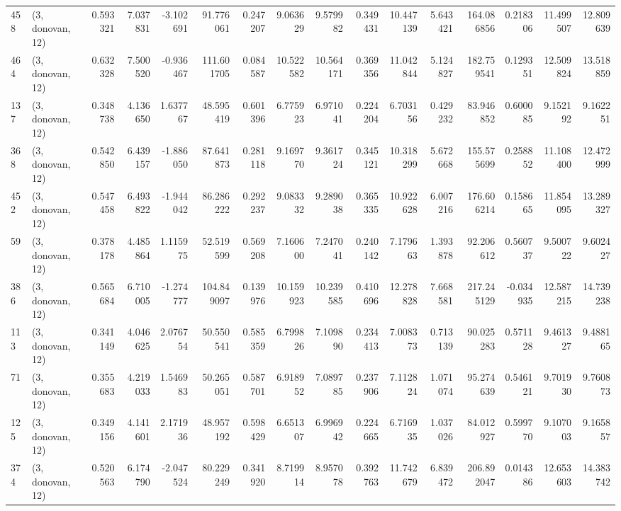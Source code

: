 \begin{tabular}{llrrrrrrrrrrrrrr}
458 &  (3, donovan, 12) &   0.593321 &   7.037831 &  -3.102691 &    91.776061 &   0.247207 &   9.063629 &   9.579982 &  0.349431 &  10.447139 &   5.643421 &   164.086856 &  0.218306 &  11.499507 &  12.809639 \\
464 &  (3, donovan, 12) &   0.632328 &   7.500520 &  -0.936467 &   111.601705 &   0.084587 &  10.522582 &  10.564171 &  0.369356 &  11.042844 &   5.124827 &   182.759541 &  0.129351 &  12.509824 &  13.518859 \\
137 &  (3, donovan, 12) &   0.348738 &   4.136650 &   1.637767 &    48.595419 &   0.601396 &   6.775923 &   6.971041 &  0.224204 &   6.703156 &   0.429232 &    83.946852 &  0.600085 &   9.152192 &   9.162251 \\
368 &  (3, donovan, 12) &   0.542850 &   6.439157 &  -1.886050 &    87.641873 &   0.281118 &   9.169770 &   9.361724 &  0.345121 &  10.318299 &   5.672668 &   155.575699 &  0.258852 &  11.108400 &  12.472999 \\
452 &  (3, donovan, 12) &   0.547458 &   6.493822 &  -1.944042 &    86.286222 &   0.292237 &   9.083332 &   9.289038 &  0.365335 &  10.922628 &   6.007216 &   176.606214 &  0.158665 &  11.854095 &  13.289327 \\
59  &  (3, donovan, 12) &   0.378178 &   4.485864 &   1.115975 &    52.519599 &   0.569208 &   7.160600 &   7.247041 &  0.240142 &   7.179663 &   1.393878 &    92.206612 &  0.560737 &   9.500722 &   9.602427 \\
386 &  (3, donovan, 12) &   0.565684 &   6.710005 &  -1.274777 &   104.849097 &   0.139976 &  10.159923 &  10.239585 &  0.410696 &  12.278828 &   7.668581 &   217.245129 & -0.034935 &  12.587215 &  14.739238 \\
113 &  (3, donovan, 12) &   0.341149 &   4.046625 &   2.076754 &    50.550541 &   0.585359 &   6.799826 &   7.109890 &  0.234413 &   7.008373 &   0.713139 &    90.025283 &  0.571128 &   9.461327 &   9.488165 \\
71  &  (3, donovan, 12) &   0.355683 &   4.219033 &   1.546983 &    50.265051 &   0.587701 &   6.918952 &   7.089785 &  0.237906 &   7.112824 &   1.071074 &    95.274639 &  0.546121 &   9.701930 &   9.760873 \\
125 &  (3, donovan, 12) &   0.349156 &   4.141601 &   2.171936 &    48.957192 &   0.598429 &   6.651307 &   6.996942 &  0.224665 &   6.716935 &   1.037026 &    84.012927 &  0.599770 &   9.107003 &   9.165857 \\
374 &  (3, donovan, 12) &   0.520563 &   6.174790 &  -2.047524 &    80.229249 &   0.341920 &   8.719914 &   8.957078 &  0.392763 &  11.742679 &   6.839472 &   206.892047 &  0.014386 &  12.653603 &  14.383742 \\

\end{tabular}
